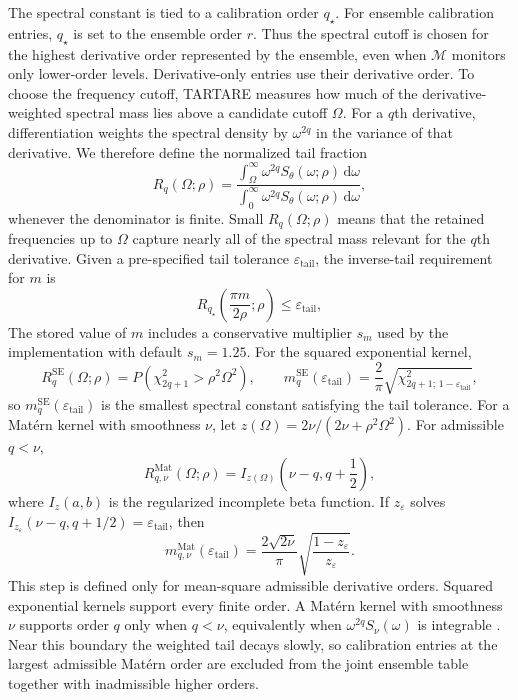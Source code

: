 \documentclass[11pt,a4paper]{article}
\theoremstyle{definition}
\theoremstyle{remark}
\begin{document}
The spectral constant is tied to a calibration order \(q_\star\). For ensemble calibration entries, \(q_\star\) is set to the ensemble order \(r\). Thus the spectral cutoff is chosen for the highest derivative order represented by the ensemble, even when \(\mathcal M\) monitors only lower-order levels. Derivative-only entries use their derivative order. To choose the frequency cutoff, TARTARE measures how much of the derivative-weighted spectral mass lies above a candidate cutoff \(\Omega\). For a \(q\)th derivative, differentiation weights the spectral density by \(\omega^{2q}\) in the variance of that derivative. We therefore define the normalized tail fraction
\[
R_q(\Omega;\rho)
=
\frac{
\int_{\Omega}^{\infty} \omega^{2q}S_\theta(\omega;\rho)\,\mathrm d\omega
}{
\int_0^{\infty} \omega^{2q}S_\theta(\omega;\rho)\,\mathrm d\omega
},
\]
whenever the denominator is finite. Small \(R_q(\Omega;\rho)\) means that the retained frequencies up to \(\Omega\) capture nearly all of the spectral mass relevant for the \(q\)th derivative. Given a pre-specified tail tolerance \(\varepsilon_{\mathrm{tail}}\), the inverse-tail requirement for \(m\) is
\[
R_{q_\star}\!\left(\frac{\pi m}{2\rho};\rho\right)
\leq \varepsilon_{\mathrm{tail}},
\]
The stored value of \(m\) includes a conservative multiplier \(s_m\) used by the implementation with default \(s_m=1.25\). For the squared exponential kernel,
\[
R_q^{\mathrm{SE}}(\Omega;\rho)
=
P\!\left(\chi^2_{2q+1}>\rho^2\Omega^2\right),
\qquad
m_q^{\mathrm{SE}}(\varepsilon_{\mathrm{tail}})
=
\frac{2}{\pi}
\sqrt{\chi^2_{2q+1;\,1-\varepsilon_{\mathrm{tail}}}},
\]
so \(m_q^{\mathrm{SE}}(\varepsilon_{\mathrm{tail}})\) is the smallest spectral constant satisfying the tail tolerance. For a Mat\'ern kernel with smoothness \(\nu\), let \(z(\Omega)=2\nu/(2\nu+\rho^2\Omega^2)\). For admissible \(q<\nu\),
\[
R_{q,\nu}^{\mathrm{Mat}}(\Omega;\rho)
=
I_{z(\Omega)}\!\left(\nu-q,q+\frac12\right),
\]
where \(I_z(a,b)\) is the regularized incomplete beta function. If \(z_\varepsilon\) solves \(I_{z_\varepsilon}(\nu-q,q+1/2)=\varepsilon_{\mathrm{tail}}\), then
\[
m_{q,\nu}^{\mathrm{Mat}}(\varepsilon_{\mathrm{tail}})
=
\frac{2\sqrt{2\nu}}{\pi}
\sqrt{\frac{1-z_\varepsilon}{z_\varepsilon}}.
\]
This step is defined only for mean-square admissible derivative orders. Squared exponential kernels support every finite order. A Mat\'ern kernel with smoothness \(\nu\) supports order \(q\) only when \(q<\nu\), equivalently when \(\omega^{2q}S_\nu(\omega)\) is integrable \citep{gpml}. Near this boundary the weighted tail decays slowly, so calibration entries at the largest admissible Mat\'ern order are excluded from the joint ensemble table together with inadmissible higher orders.
\end{document}
